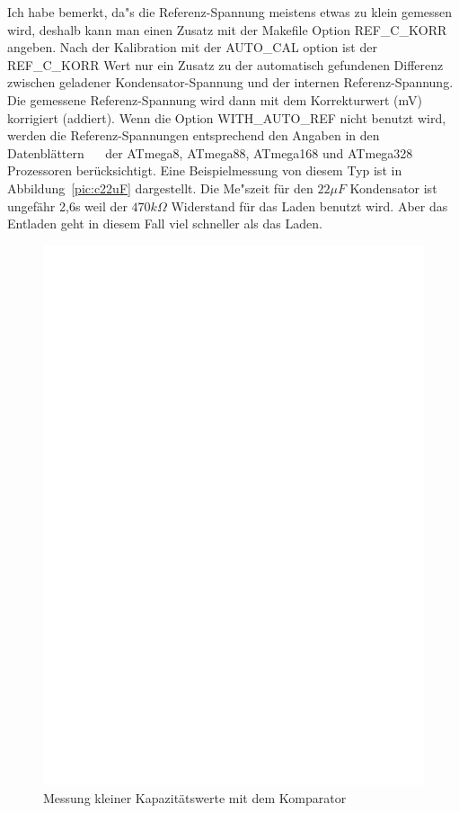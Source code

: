 Ich habe bemerkt, da"s die Referenz-Spannung meistens etwas zu klein gemessen wird,
 deshalb kann man einen Zusatz mit der Makefile Option REF\_C\_KORR angeben.
Nach der Kalibration mit der AUTO\_CAL option ist der REF\_C\_KORR Wert nur ein Zusatz zu der automatisch
gefundenen Differenz zwischen geladener Kondensator-Spannung und der internen Referenz-Spannung.
Die gemessene Referenz-Spannung wird dann mit dem Korrekturwert (mV) korrigiert (addiert).
Wenn die Option WITH\_AUTO\_REF nicht benutzt wird, werden die Referenz-Spannungen entsprechend den Angaben in den
Datenbl\"attern ~\cite{ATmega8}~\cite{ATmega168} der ATmega8, ATmega88, ATmega168 und ATmega328 Prozessoren ber\"ucksichtigt.
Eine Beispielmessung von diesem Typ ist in Abbildung~\ref{pic:c22uF} dargestellt.
Die Me"szeit f\"ur den \(22 \mu F\) Kondensator ist ungef\"ahr 2,6s weil der \(470k\Omega\) Widerstand f\"ur das Laden benutzt wird.
Aber das Entladen geht in diesem Fall viel schneller als das Laden.

\begin{figure}[H]
\centering
\includegraphics[]{../FIG/Comparat.eps}
\caption{Messung kleiner Kapazit\"atswerte mit dem Komparator}
\label{fig:comparat}
\end{figure}

